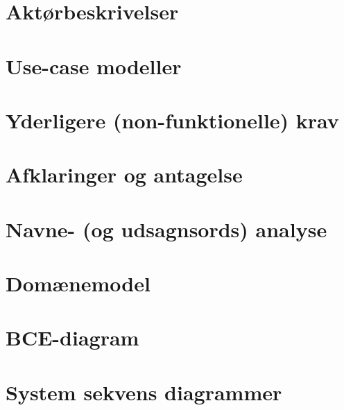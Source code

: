\section{Aktørbeskrivelser}

\section{Use-case modeller}

\section{Yderligere (non-funktionelle) krav}

\section{Afklaringer og antagelse}

\section{Navne- (og udsagnsords) analyse}

\section{Domænemodel}

\section{BCE-diagram}

\section{System sekvens diagrammer}